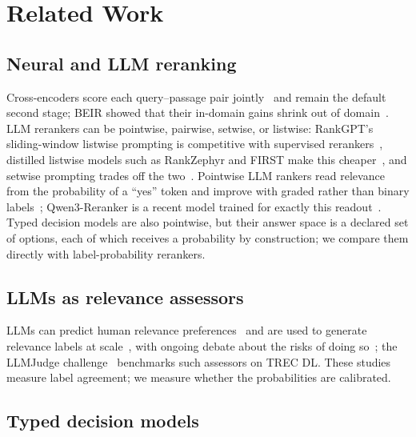 \section{Related Work}

\subsection{Neural and LLM reranking}

Cross-encoders score each query--passage pair jointly~\cite{nogueira2019monobert,nogueira2020monot5} and remain the default second stage; BEIR showed that their in-domain gains shrink out of domain~\cite{thakur2021beir}.
LLM rerankers can be pointwise, pairwise, setwise, or listwise: RankGPT's sliding-window listwise prompting is competitive with supervised rerankers~\cite{sun2023rankgpt}, distilled listwise models such as RankZephyr and FIRST make this cheaper~\cite{pradeep2023rankzephyr,reddy2024first}, and setwise prompting trades off the two~\cite{zhuang2023setwise}.
Pointwise LLM rankers read relevance from the probability of a ``yes'' token and improve with graded rather than binary labels~\cite{zhuang2023beyond}; Qwen3-Reranker is a recent model trained for exactly this readout~\cite{qwen3embedding}.
Typed decision models are also pointwise, but their answer space is a declared set of options, each of which receives a probability by construction; we compare them directly with label-probability rerankers.

\subsection{LLMs as relevance assessors}

LLMs can predict human relevance preferences~\cite{thomas2023llmpref} and are used to generate relevance labels at scale~\cite{upadhyay2024umbrela}, with ongoing debate about the risks of doing so~\cite{faggioli2023perspectives,clarke2024cantreplace}; the LLMJudge challenge~\cite{rahmani2024llmjudge} benchmarks such assessors on TREC DL. These studies measure label agreement; we measure whether the probabilities are calibrated.

\subsection{Typed decision models}

